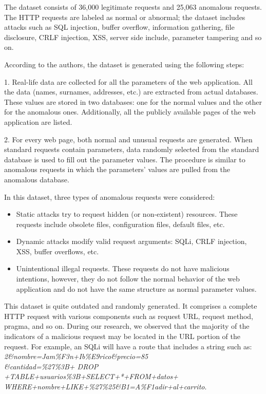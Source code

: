 The dataset consists of 36,000 legitimate requests and 25,063 anomalous requests. The HTTP requests are labeled as normal or abnormal; the dataset includes attacks such as SQL injection, buffer overflow, information gathering, file disclosure, CRLF injection, XSS, server side include, parameter tampering and so on. 

According to the authors, the dataset is generated using the following steps: 

1.	Real-life data are collected for all the parameters of the web application. All the data (names, surnames, addresses, etc.) are extracted from actual databases. These values are stored in two databases: one for the normal values and the other for the anomalous ones. Additionally, all the publicly available pages of the web application are listed. 

2.	For every web page, both normal and unusual requests are generated. When standard requests contain parameters, data randomly selected from the standard database is used to fill out the parameter values. The procedure is similar to anomalous requests in which the parameters' values are pulled from the anomalous database.  

In this dataset, three types of anomalous requests were considered: 
\begin{itemize}
	\item Static attacks try to request hidden (or non-existent) resources. These requests include obsolete files, configuration files, default files, etc. 
	\item Dynamic attacks modify valid request arguments: SQLi, CRLF injection, XSS, buffer overflows, etc.
	\item Unintentional illegal requests. These requests do not have malicious intentions, however, they do not follow the normal behavior of the web application and do not have the same structure as normal parameter values.
\end{itemize}

This dataset is quite outdated and randomly generated. It comprises a complete HTTP request with various components such as request URL, request method, pragma, and so on. During our research, we observed that the majority of the indicators of a malicious request may be located in the URL portion of the request. For example, an SQLi will have a route that includes a string such as: \textit{2\&nombre=Jam\%F3n+Ib\%E9rico\&precio=85 \\ \&cantidad=\%27\%3B+  DROP +TABLE+usuarios\%3B+SELECT+*+FROM+datos+ \\ WHERE+nombre+LIKE+\%27\%25\&B1=A\%F1adir+al+carrito}.

